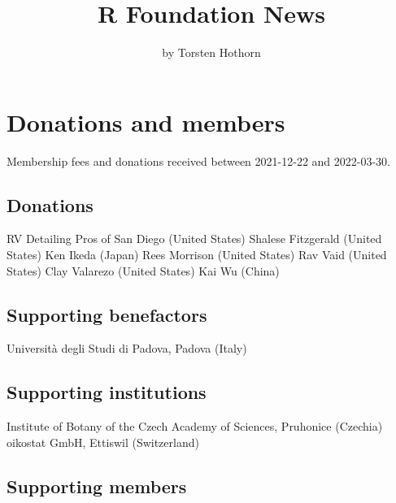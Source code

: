
\title{R Foundation News}
\author{by Torsten Hothorn}

\maketitle

\section{Donations and members}

Membership fees and donations received between 
2021-12-22 and 2022-03-30.

\subsection{Donations}


RV Detailing Pros of San Diego (United States)
Shalese Fitzgerald (United States)
Ken Ikeda (Japan)
Rees Morrison (United States)
Rav Vaid (United States)
Clay Valarezo (United States)
Kai Wu (China)

\subsection{Supporting benefactors}

Università degli Studi di Padova, Padova (Italy)

\subsection{Supporting institutions}


Institute of Botany of the Czech Academy of Sciences, Pruhonice (Czechia)
oikostat GmbH, Ettiswil (Switzerland)

\subsection{Supporting members}


